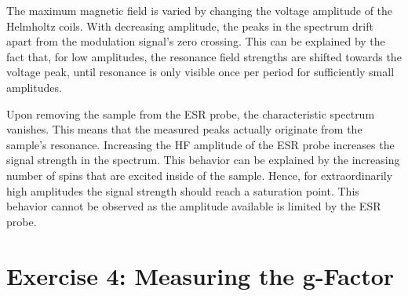 The maximum magnetic field is varied by changing the voltage amplitude of the Helmholtz coils.
With decreasing amplitude, the peaks in the spectrum drift apart from the modulation signal's zero crossing.
This can be explained by the fact that, for low amplitudes, the resonance field strengths are shifted towards the voltage peak, until resonance is only visible once per period for sufficiently small amplitudes.

Upon removing the sample from the ESR probe, the characteristic spectrum vanishes.
This means that the measured peaks actually originate from the sample's resonance.
Increasing the HF amplitude of the ESR probe increases the signal strength in the spectrum.
This behavior can be explained by the increasing number of spins that are excited inside of the sample.
Hence, for extraordinarily high amplitudes the signal strength should reach a saturation point.
This behavior cannot be observed as the amplitude available is limited by the ESR probe.

\section{Exercise 4: Measuring the g-Factor}

